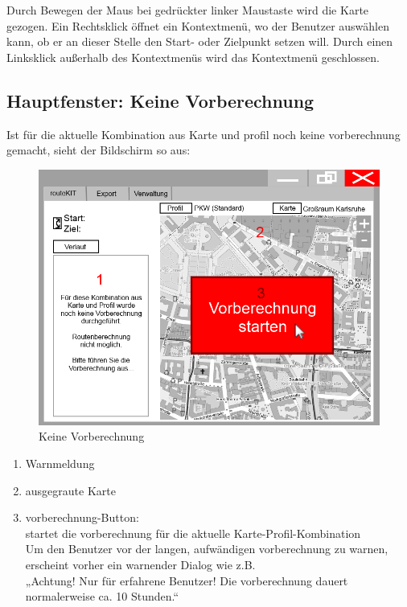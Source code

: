 \documentclass[a4paper, 11pt]{article}
\begin{document}
Durch Bewegen der Maus bei gedrückter linker Maustaste wird die Karte gezogen. Ein Rechtsklick öffnet ein Kontextmenü, wo der Benutzer auswählen kann, ob er an dieser Stelle den Start- oder Zielpunkt setzen will. Durch einen Linksklick außerhalb des Kontextmenüs wird das Kontextmenü geschlossen.

\subsection{Hauptfenster: Keine Vorberechnung}

Ist für die aktuelle Kombination aus Karte und \gls{profil} noch keine \gls{vorberechnung} gemacht, sieht der Bildschirm so aus:
\begin{figure}[H]
\centering
\includegraphics[width=0.9\linewidth]{mockup_screenshot_nicht_berechnet}
\caption{Keine Vorberechnung}
\label{fig:mockupscreenshotkeinevorberechnung}
\end{figure}
\begin{enumerate}
\item Warnmeldung
\item ausgegraute Karte
\item \gls{vorberechnung}-Button:\\
startet die \gls{vorberechnung} für die aktuelle Karte-Profil-Kombination\\
Um den Benutzer vor der langen, aufwändigen \gls{vorberechnung} zu warnen, erscheint vorher ein warnender Dialog wie z.B.\\
„Achtung! Nur für erfahrene Benutzer! Die \gls{vorberechnung} dauert normalerweise ca. 10 Stunden.“
\end{enumerate}
\end{document}
